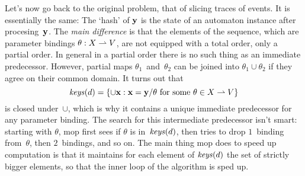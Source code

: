 Let's now go back to the original problem, that of slicing traces of events.
It is essentially the same:
The `hash' of ${\bf y}$ is the state of an automaton instance after procesing~${\bf y}$.
The {\it main difference\/} is that the elements of the sequence, which are parameter bindings $\theta:X\rightharpoonup V$, are not equipped with a total order, only a partial order.
In general in a partial order there is no such thing as an immediate predecessor.
However, partial maps $\theta_1$~and~$\theta_2$ can be joined into $\theta_1\cup\theta_2$ if they agree on their common domain.
It turns out that
$${\it keys}(d)=\{\cup{\bf x} : \hbox{${\bf x}={\bf y}/\theta$ for some $\theta\in X\rightharpoonup V$}\}$$
is closed under~$\cup$, which is why it contains a unique immediate predecessor for any parameter binding.
The search for this intermediate predecessor isn't smart: starting with $\theta$, mop first sees if $\theta$ is in~${\it keys}(d)$, then tries to drop $1$~binding from~$\theta$, then $2$~bindings, and so on.
The main thing mop does to speed up computation is that it maintains for each element of ${\it keys}(d)$ the set of strictly bigger elements, so that the inner loop of the algorithm is sped up.


\bye
